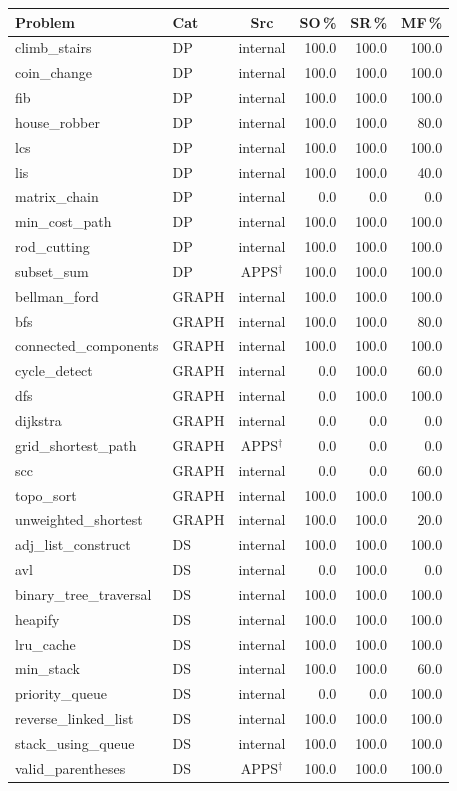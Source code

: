 \begin{tabular}{@{}llcrrr@{}}
\toprule
Problem & Cat & Src & SO\,\% & SR\,\% & MF\,\% \\
\midrule
climb\_stairs & DP & internal & 100.0 & 100.0 & 100.0 \\
coin\_change & DP & internal & 100.0 & 100.0 & 100.0 \\
fib & DP & internal & 100.0 & 100.0 & 100.0 \\
house\_robber & DP & internal & 100.0 & 100.0 & 80.0 \\
lcs & DP & internal & 100.0 & 100.0 & 100.0 \\
lis & DP & internal & 100.0 & 100.0 & 40.0 \\
matrix\_chain & DP & internal & 0.0 & 0.0 & 0.0 \\
min\_cost\_path & DP & internal & 100.0 & 100.0 & 100.0 \\
rod\_cutting & DP & internal & 100.0 & 100.0 & 100.0 \\
subset\_sum & DP & APPS$^\dagger$ & 100.0 & 100.0 & 100.0 \\
\midrule
bellman\_ford & GRAPH & internal & 100.0 & 100.0 & 100.0 \\
bfs & GRAPH & internal & 100.0 & 100.0 & 80.0 \\
connected\_components & GRAPH & internal & 100.0 & 100.0 & 100.0 \\
cycle\_detect & GRAPH & internal & 0.0 & 100.0 & 60.0 \\
dfs & GRAPH & internal & 0.0 & 100.0 & 100.0 \\
dijkstra & GRAPH & internal & 0.0 & 0.0 & 0.0 \\
grid\_shortest\_path & GRAPH & APPS$^\dagger$ & 0.0 & 0.0 & 0.0 \\
scc & GRAPH & internal & 0.0 & 0.0 & 60.0 \\
topo\_sort & GRAPH & internal & 100.0 & 100.0 & 100.0 \\
unweighted\_shortest & GRAPH & internal & 100.0 & 100.0 & 20.0 \\
\midrule
adj\_list\_construct & DS & internal & 100.0 & 100.0 & 100.0 \\
avl & DS & internal & 0.0 & 100.0 & 0.0 \\
binary\_tree\_traversal & DS & internal & 100.0 & 100.0 & 100.0 \\
heapify & DS & internal & 100.0 & 100.0 & 100.0 \\
lru\_cache & DS & internal & 100.0 & 100.0 & 100.0 \\
min\_stack & DS & internal & 100.0 & 100.0 & 60.0 \\
priority\_queue & DS & internal & 0.0 & 0.0 & 100.0 \\
reverse\_linked\_list & DS & internal & 100.0 & 100.0 & 100.0 \\
stack\_using\_queue & DS & internal & 100.0 & 100.0 & 100.0 \\
valid\_parentheses & DS & APPS$^\dagger$ & 100.0 & 100.0 & 100.0 \\
\bottomrule
\end{tabular}
